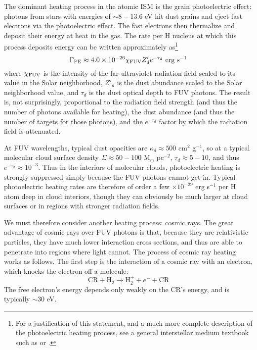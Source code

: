 The dominant heating process in the atomic ISM is the grain photoelectric effect: photons from stars with energies of $\sim 8-13.6$ eV hit dust grains and eject fast electrons via the photoelectric effect. The fast electrons then thermalize and deposit their energy at heat in the gas. The rate per H nucleus at which this process deposits energy can be written approximately as\footnote{For a justification of this statement, and a much more complete description of the photoelectric heating process, see a general interstellar medium textbook such as \citet{tielens05a} or \citet{draine11a}.}
\begin{equation}
\Gamma_{\rm PE} \approx 4.0\times 10^{-26} \chi_{\rm FUV} Z_d' e^{-\tau_d}\mbox{ erg s}^{-1}
\end{equation}
where $\chi_{\rm FUV}$ is the intensity of the far ultraviolet radiation field scaled to its value in the Solar neighborhood, $Z'_d$ is the dust abundance scaled to the Solar neighborhood value, and $\tau_d$ is the dust optical depth to FUV photons. The result is, not surprisingly, proportional to the radiation field strength (and thus the number of photons available for heating), the dust abundance (and thus the number of targets for those photons), and the $e^{-\tau_d}$ factor by which the radiation field is attenuated.

At FUV wavelengths, typical dust opacities are $\kappa_d \approx 500$ cm$^2$ g$^{-1}$, so at a typical molecular cloud surface density $\Sigma\approx 50 - 100$ M$_\odot$ pc$^{-2}$, $\tau_d \approx 5-10$, and thus $e^{-\tau_d} \approx 10^{-3}$. Thus in the interiors of molecular clouds, photoelectric heating is strongly suppressed simply because the FUV photons cannot get in. Typical photoelectric heating rates are therefore of order a few $\times 10^{-29}$ erg s$^{-1}$ per H atom deep in cloud interiors, though they can obviously be much larger at cloud surfaces or in regions with stronger radiation fields.

We must therefore consider another heating process: cosmic rays. The great advantage of cosmic rays over FUV photons is that, because they are relativistic particles, they have much lower interaction cross sections, and thus are able to penetrate into regions where light cannot. The process of cosmic ray heating works as follows. The first step is the interaction of a cosmic ray with an electron, which knocks the electron off a molecule:
\begin{equation}
\mbox{CR}+\mbox{H}_2 \rightarrow \mbox{H}_2^+ +e^- + \mbox{CR}
\end{equation}
The free electron's energy depends only weakly on the CR's energy, and is typically $\sim 30$ eV.

